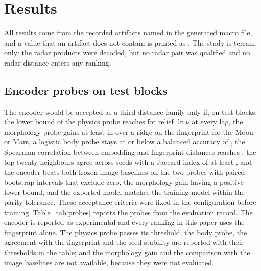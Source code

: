\section{Results}
\label{sec:results}

All results come from the recorded artifacts named in the generated macro file, and a value that
an artifact does not contain is printed as \NotAvailable. The study is terrain only: the radar
products were decoded, but no radar pair was qualified and no radar distance enters any ranking.

\subsection{Encoder probes on test blocks}
\label{sec:results-ml}

The encoder would be accepted as a third distance family only if, on test blocks, the lower bound of
the physics probe \Rsq{} reaches \GFivePhysRMin{} for relief $\ln \nu$ at every lag, the morphology
probe gains at least \GFiveMorphGainMin{} in \Rsq{} over a ridge on the fingerprint for the Moon or
Mars, a logistic body probe stays at or below a balanced accuracy of \GFiveBodyAccMax, the Spearman
correlation between embedding and fingerprint distances reaches \GFiveRhoMin, the top twenty
neighbours agree across seeds with a Jaccard index of at least \GFiveJaccardMin, and the encoder
beats both frozen image baselines on the two probes with paired bootstrap intervals that exclude zero, the morphology gain having a positive lower bound, and the exported model matches the training model within the parity tolerance. These acceptance criteria were fixed in the
configuration before training. Table~\ref{tab:probes} reports the probes from the evaluation
record. The encoder is reported as experimental and every ranking in this paper uses the fingerprint alone. The physics probe passes its threshold; the body probe, the agreement with the fingerprint and the seed stability are reported with their thresholds in the table; and the morphology gain and the comparison with the image baselines are not available, because they were not evaluated.

